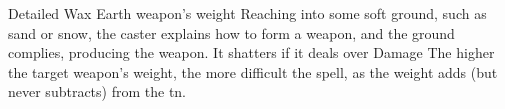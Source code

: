   {Detailed}%
  {Wax}%
  {Earth}%
  {weapon's \gls{weight}}%
  {Reaching into some soft ground, such as sand or snow, the caster explains how to form a weapon, and the ground complies, producing the weapon.
  It shatters if it deals over  Damage}%
  {
    The higher the target weapon's \gls{weight}, the more difficult the spell, as the \gls{weight} adds (but never subtracts) from the \gls{tn}.
  }
